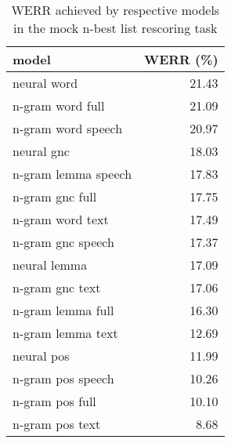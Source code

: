 \begin{table}[!htbp]
	\centering
	\caption{WERR achieved by respective models in the mock n-best list rescoring task}
	\label{table:max_werr}
	\begin{tabular*}{.4\linewidth}{@{\extracolsep{\fill}}lr}
		model  & WERR (\%)\\
		\midrule
		neural word   & 21.43\\
		n-gram word full  & 21.09\\
		n-gram word speech  & 20.97\\
		neural gnc    & 18.03\\
		n-gram lemma speech  & 17.83\\
		n-gram gnc full  & 17.75\\
		n-gram word text  & 17.49\\
		n-gram gnc speech  & 17.37\\
		neural lemma  & 17.09\\
		n-gram gnc text  & 17.06\\
		n-gram lemma full  & 16.30\\
		n-gram lemma text  & 12.69\\
		neural pos    & 11.99\\
		n-gram pos speech  & 10.26\\
		n-gram pos full  & 10.10\\
		n-gram pos text  & 8.68\\
	\end{tabular*}
\end{table}
